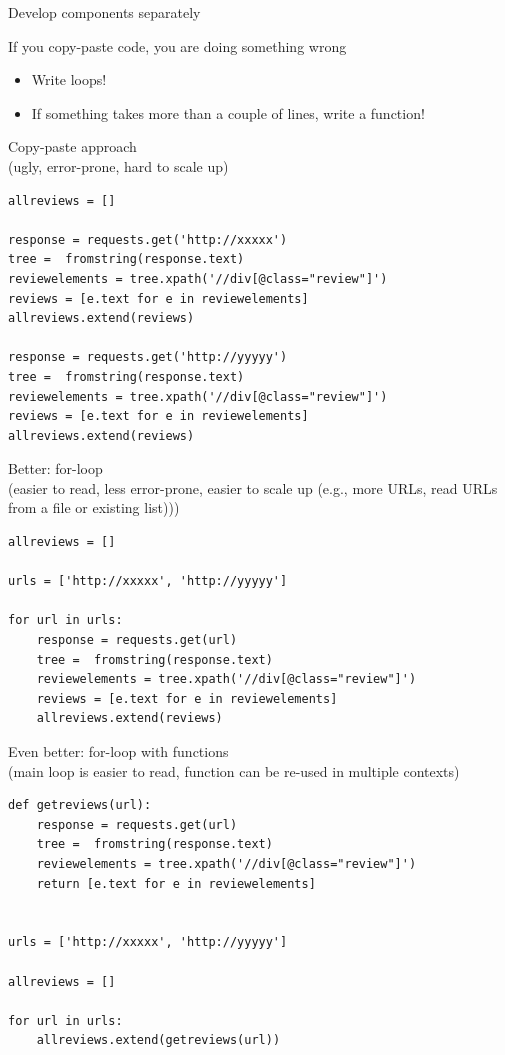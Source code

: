 \documentclass{beamer}
\begin{document}
\begin{frame}{Develop components separately}
	\begin{block}{If you copy-paste code, you are doing something wrong}
		\begin{itemize}[<+->]
			\item Write loops!
			\item If something takes more than a couple of lines, write a function!
		\end{itemize}
	\end{block}
\end{frame}

\begin{frame}
Copy-paste approach\\ (ugly, error-prone, hard to scale up)
\begin{lstlisting}
allreviews = []

response = requests.get('http://xxxxx')
tree =  fromstring(response.text)
reviewelements = tree.xpath('//div[@class="review"]')
reviews = [e.text for e in reviewelements]
allreviews.extend(reviews)

response = requests.get('http://yyyyy')
tree =  fromstring(response.text)
reviewelements = tree.xpath('//div[@class="review"]')
reviews = [e.text for e in reviewelements]
allreviews.extend(reviews)
\end{lstlisting}
\end{frame}


\begin{frame}
Better: for-loop\\ (easier to read, less error-prone, easier to scale up (e.g., more URLs, read URLs from a file or existing list)))
\begin{lstlisting}
allreviews = []

urls = ['http://xxxxx', 'http://yyyyy']

for url in urls:
    response = requests.get(url)
    tree =  fromstring(response.text)
    reviewelements = tree.xpath('//div[@class="review"]')
    reviews = [e.text for e in reviewelements]
    allreviews.extend(reviews)
\end{lstlisting}
\end{frame}




\begin{frame}
Even better: for-loop with functions\\ (main loop is easier to read, function can be re-used in multiple contexts)
\begin{lstlisting}
def getreviews(url):
    response = requests.get(url)
    tree =  fromstring(response.text)
    reviewelements = tree.xpath('//div[@class="review"]')
    return [e.text for e in reviewelements]


urls = ['http://xxxxx', 'http://yyyyy']

allreviews = []

for url in urls:
    allreviews.extend(getreviews(url))
\end{lstlisting}
\end{frame}
\end{document}
